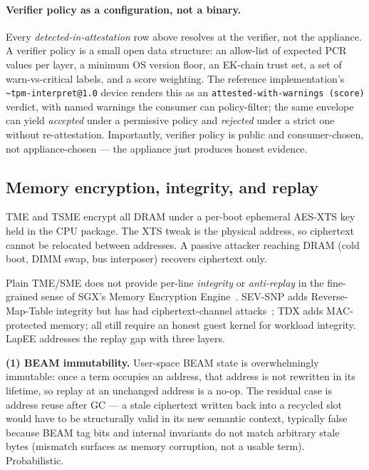 \documentclass[10pt,a4paper]{article}
\begin{document}
\paragraph{Verifier policy as a configuration, not a binary.} Every
\emph{detected-in-attestation} row above resolves at the verifier, not
the appliance. A verifier policy is a small open data structure: an
allow-list of expected PCR values per layer, a minimum OS version
floor, an EK-chain trust set, a set of warn-vs-critical labels, and a
score weighting. The reference implementation's
\texttt{\~{}tpm-interpret@1.0} device renders this as an
\texttt{attested-with-warnings (score)} verdict, with named warnings
the consumer can policy-filter; the same envelope can yield
\emph{accepted} under a permissive policy and \emph{rejected} under a
strict one without re-attestation. Importantly, verifier policy is
public and consumer-chosen, not appliance-chosen --- the appliance
just produces honest evidence.

\subsection{Memory encryption, integrity, and replay}
\label{sec:memenc}
\vspace{-0.2em}

TME and TSME encrypt all DRAM under a per-boot ephemeral AES-XTS key held
in the CPU package. The XTS tweak is the physical address, so ciphertext
cannot be relocated between addresses. A passive attacker reaching DRAM
(cold boot, DIMM swap, bus interposer) recovers ciphertext only.

Plain TME/SME does not provide per-line \emph{integrity} or
\emph{anti-replay} in the fine-grained sense of SGX's Memory Encryption
Engine~\cite{costan-sgx}. SEV-SNP adds Reverse-Map-Table integrity but has
had ciphertext-channel attacks~\cite{cipherleaks}; TDX adds MAC-protected
memory; all still require an honest guest kernel for workload integrity.
LapEE addresses the replay gap with three layers.

\textbf{(1) BEAM immutability.} User-space BEAM state is overwhelmingly
immutable: once a term occupies an address, that address is not
rewritten in its lifetime, so replay at an unchanged address is a no-op.
The residual case is address reuse after GC --- a stale ciphertext
written back into a recycled slot would have to be structurally valid
in its new semantic context, typically false because BEAM tag bits and
internal invariants do not match arbitrary stale bytes (mismatch surfaces
as memory corruption, not a usable term). Probabilistic.
\end{document}
